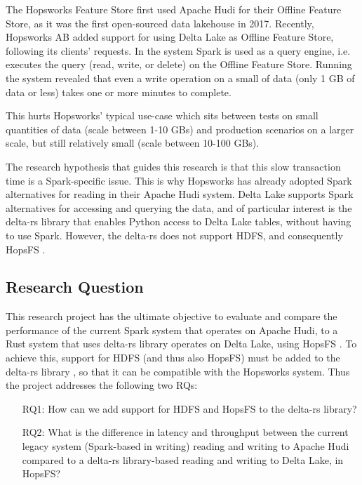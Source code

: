 The Hopsworks Feature Store \cite{HopsworksBatchRealtime2024} first used Apache Hudi for their Offline Feature Store, as it was the first open-sourced data lakehouse in 2017. Recently, Hopsworks \gls{AB} added support for using Delta Lake as Offline Feature Store, following its clients' requests. In the system Spark is used as a query engine, i.e. executes the query (read, write, or delete) on the Offline Feature Store. Running the system revealed that even a write operation on a small of data (only 1 GB of data or less) takes one or more minutes to complete.

This hurts Hopsworks' typical use-case which sits between tests on small quantities of data (scale between 1-10 GBs) and production scenarios on a larger scale, but still relatively small (scale between 10-100 GBs).

The research hypothesis that guides this research is that this slow transaction time is a Spark-specific issue. This is why Hopsworks has already adopted Spark alternatives \cite{Khazanchi1801362} for reading in their Apache Hudi system. Delta Lake supports Spark alternatives for accessing and querying the data, and of particular interest is the delta-rs library \cite{DeltaioDeltars2024} that enables Python access to Delta Lake tables, without having to use Spark. 
However, the delta-rs \cite{DeltaioDeltars2024} does not support \gls{HDFS}, and consequently \gls{HopsFS} \cite{niaziHopsFSScalingHierarchical2017}.

\subsection{Research Question}
\label{subsec:researchQuestion}
This research project has the ultimate objective to evaluate and compare the performance of the current Spark system that operates on Apache Hudi, to a Rust system that uses delta-rs library \cite{DeltaioDeltars2024} operates on Delta Lake, using \gls{HopsFS} \cite{niaziHopsFSScalingHierarchical2017}. To achieve this, support for \gls{HDFS} (and thus also \gls{HopsFS}) must be added to the delta-rs library \cite{DeltaioDeltars2024}, so that it can be compatible with the Hopsworks system. Thus the project addresses the following two \glspl{RQ}:
\begin{enumerate}
    \item[RQ1:] How can we add support for \gls{HDFS} and \gls{HopsFS} to the delta-rs library?
    \item[RQ2:] What is the difference in latency and throughput between the current legacy system (Spark-based in writing) reading and writing to Apache Hudi compared to a delta-rs library-based reading and writing to Delta Lake, in \gls{HopsFS}?
\end{enumerate}

